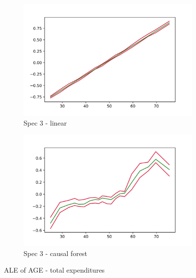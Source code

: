 \begin{figure}[h]
    \begin{subfigure}{0.5\linewidth}
        \includegraphics[width=\linewidth]{figures/ALE/chTOTexp/spec3_linear_AGE.png}
        \caption{Spec 3 - linear}
    \end{subfigure}%
    \begin{subfigure}{0.5\linewidth}
        \includegraphics[width=\linewidth]{figures/ALE/chTOTexp/spec3_cf_AGE.png}
        \caption{Spec 3 - causal forest}
    \end{subfigure}
    \caption{ALE of AGE - total expenditures}
    \label{app:ale_age_tot}
\end{figure}

